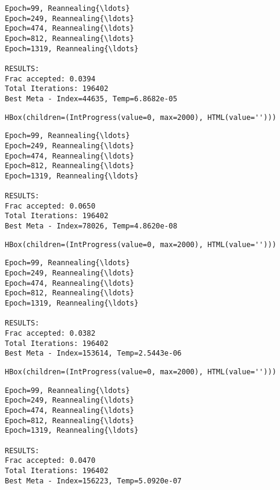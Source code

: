 \documentclass[11pt]{article}
\begin{document}
    
    \begin{Verbatim}[commandchars=\\\{\}]
Epoch=99, Reannealing{\ldots}
Epoch=249, Reannealing{\ldots}
Epoch=474, Reannealing{\ldots}
Epoch=812, Reannealing{\ldots}
Epoch=1319, Reannealing{\ldots}

RESULTS:
Frac accepted: 0.0394
Total Iterations: 196402
Best Meta - Index=44635, Temp=6.8682e-05

    \end{Verbatim}

    
    \begin{verbatim}
HBox(children=(IntProgress(value=0, max=2000), HTML(value='')))
    \end{verbatim}

    
    \begin{Verbatim}[commandchars=\\\{\}]
Epoch=99, Reannealing{\ldots}
Epoch=249, Reannealing{\ldots}
Epoch=474, Reannealing{\ldots}
Epoch=812, Reannealing{\ldots}
Epoch=1319, Reannealing{\ldots}

RESULTS:
Frac accepted: 0.0650
Total Iterations: 196402
Best Meta - Index=78026, Temp=4.8620e-08

    \end{Verbatim}

    
    \begin{verbatim}
HBox(children=(IntProgress(value=0, max=2000), HTML(value='')))
    \end{verbatim}

    
    \begin{Verbatim}[commandchars=\\\{\}]
Epoch=99, Reannealing{\ldots}
Epoch=249, Reannealing{\ldots}
Epoch=474, Reannealing{\ldots}
Epoch=812, Reannealing{\ldots}
Epoch=1319, Reannealing{\ldots}

RESULTS:
Frac accepted: 0.0382
Total Iterations: 196402
Best Meta - Index=153614, Temp=2.5443e-06

    \end{Verbatim}

    
    \begin{verbatim}
HBox(children=(IntProgress(value=0, max=2000), HTML(value='')))
    \end{verbatim}

    
    \begin{Verbatim}[commandchars=\\\{\}]
Epoch=99, Reannealing{\ldots}
Epoch=249, Reannealing{\ldots}
Epoch=474, Reannealing{\ldots}
Epoch=812, Reannealing{\ldots}
Epoch=1319, Reannealing{\ldots}

RESULTS:
Frac accepted: 0.0470
Total Iterations: 196402
Best Meta - Index=156223, Temp=5.0920e-07

    \end{Verbatim}
\end{document}
